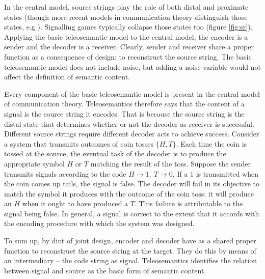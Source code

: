 

In the central model, source strings play the role of both distal and proximate states (though more recent models in communication theory distinguish those states, e.g \citet{berger1996ceo}).
Signalling games typically collapse those states too (figure \ref{fig:sr}).
Applying the basic teleosemantic model to the central model, the encoder is a sender and the decoder is a receiver.
Clearly, sender and receiver share a proper function as a consequence of design: to reconstruct the source string.
The basic teleosemantic model does not include noise, but adding a noise variable would not affect the definition of semantic content.



Every component of the basic teleosemantic model is present in the central model of communication theory.
Teleosemantics therefore says that the content of a signal is the source string it encodes.
That is because the source string is the distal state that determines whether or not the decoder-as-receiver is successful.
Different source strings require different decoder acts to achieve success.
Consider a system that transmits outcomes of coin tosses $\{H,T\}$.
Each time the coin is tossed at the source, the eventual task of the decoder is to produce the appropriate symbol $H$ or $T$ matching the result of the toss.
Suppose the sender transmits signals according to the code $H\rightarrow1,\ T\rightarrow0$.
If a 1 is transmitted when the coin comes up tails, the signal is false.
The decoder will fail in its objective to match the symbol it produces with the outcome of the coin toss: it will produce an $H$ when it ought to have produced a $T$.
This failure is attributable to the signal being false.
In general, a signal is correct to the extent that it accords with the encoding procedure with which the system was designed.

To sum up, by dint of joint design, encoder and decoder have as a shared proper function to reconstruct the source string at the target.
They do this by means of an intermediary -- the code string as signal.
Teleosemantics identifies the relation between signal and source as the basic form of semantic content.

